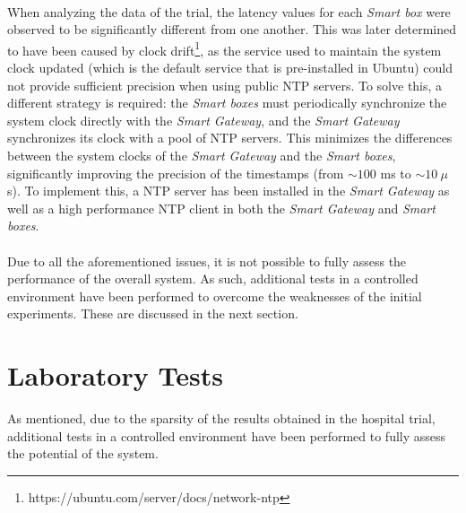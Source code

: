 \paragraph{} When analyzing the data of the trial, the latency values for each \textit{Smart box} were observed to be significantly different from one another. This was later determined to have been caused by clock drift\footnote{https://ubuntu.com/server/docs/network-ntp}, as the service used to maintain the system clock updated (which is the default service that is pre-installed in Ubuntu) could not provide sufficient precision when using public \acf{NTP} servers. To solve this, a different strategy is required: the \textit{Smart boxes} must periodically synchronize the system clock directly with the \textit{Smart Gateway}, and the \textit{Smart Gateway} synchronizes its clock with a pool of \acs{NTP} servers. This minimizes the differences between the system clocks of the \textit{Smart Gateway} and the \textit{Smart boxes}, significantly improving the precision of the timestamps (from ${\sim}  100$ ms to ${\sim}  10\ \mu$s). 
To implement this, a \acs{NTP} server has been installed in the \textit{Smart Gateway} as well as a high performance \acs{NTP} client in both the \textit{Smart Gateway} and \textit{Smart boxes}. 

\paragraph{} Due to all the aforementioned issues, it is not possible to fully assess the performance of the overall system. As such, additional tests in a controlled environment have been performed to overcome the weaknesses of the initial experiments. These are discussed in the next section.

\section{Laboratory Tests}

As mentioned, due to the sparsity of the results obtained in the hospital trial, additional tests in a controlled environment have been performed to fully assess the potential of the system.


